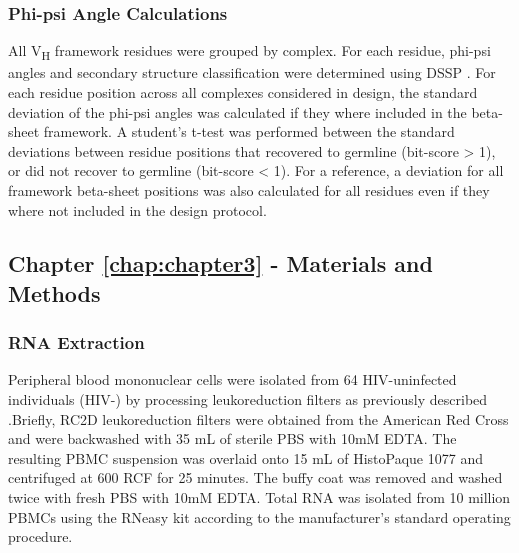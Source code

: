 \subsubsection{Phi-psi Angle Calculations}
All V\textsubscript{H} framework residues were grouped by complex. For each residue, phi-psi angles and secondary structure classification were determined using DSSP \citep{Kabsch:1983bp}. For each residue position across all complexes considered in design, the standard deviation of the phi-psi angles was calculated if they where included in the beta-sheet framework. A student's t-test was performed between the standard deviations between residue positions that recovered to germline (bit-score > 1), or did not recover to germline (bit-score < 1). For a reference, a deviation for all framework beta-sheet positions was also calculated for all residues even if they where not included in the design protocol.
\clearpage
\subsection{Chapter \ref{chap:chapter3} - Materials and Methods}
\par\vspace{10pt}
\subsubsection{RNA Extraction}
Peripheral blood mononuclear cells were isolated from 64 HIV-uninfected individuals (HIV-\naive) by processing leukoreduction filters as previously described \citep{Weitkamp:2001vm} .Briefly, RC2D leukoreduction filters were obtained from the American Red Cross and were backwashed with 35 mL of sterile PBS with 10mM EDTA. The resulting PBMC suspension was overlaid onto 15 mL of HistoPaque 1077 and centrifuged at 600 RCF for 25 minutes. The buffy coat was removed and washed twice with fresh PBS with 10mM EDTA. Total RNA was isolated from 10 million PBMCs using the RNeasy kit according to the manufacturer's standard operating procedure.

